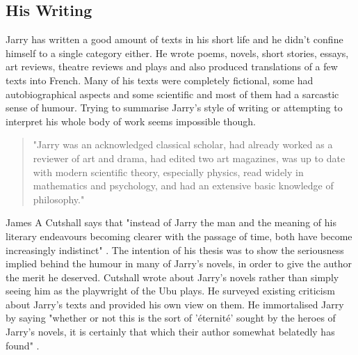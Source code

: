 \subsection*{His Writing}

Jarry has written a good amount of texts in his short life and he didn't confine himself to a single category either. He wrote poems, novels, short stories, essays, art reviews, theatre reviews and plays and also produced translations of a few texts into French. Many of his texts were completely fictional, some had autobiographical aspects and some scientific and most of them had a sarcastic sense of humour. Trying to summarise Jarry's style of writing or attempting to interpret his whole body of work seems impossible though.

\begin{quote}
  "Jarry was an acknowledged classical scholar, had already worked as a reviewer of art and drama, had edited two art magazines, was up to date with modern scientific theory, especially physics, read widely in mathematics and psychology, and had an extensive basic knowledge of philosophy." \citep{Brotchie2011}
\end{quote}

James A Cutshall says that "instead of Jarry the man and the meaning of his literary endeavours becoming clearer with the passage of time, both have become increasingly indistinct" \citep[p.246]{Cutshall1988}. The intention of his thesis was to show the seriousness implied behind the humour in many of Jarry's novels, in order to give the author the merit he deserved. Cutshall wrote about Jarry's novels rather than simply seeing him as the playwright of the Ubu plays. He surveyed existing criticism about Jarry's texts and provided his own view on them. He immortalised Jarry by saying "whether or not this is the sort of 'éternité' sought by the heroes of Jarry's novels, it is certainly that which their author somewhat belatedly has found" \citep[p.248]{Cutshall1988}.

